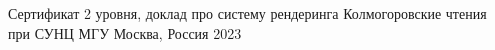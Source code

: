 



\begin{cvhonors}

  \cvhonor
    {Сертификат 2 уровня, доклад про систему рендеринга} %
    {Колмогоровские чтения при СУНЦ МГУ} %
    {Москва, Россия} %
    {2023} %

\end{cvhonors}


